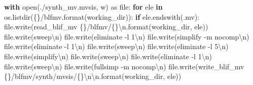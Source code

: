 \documentclass[
]{book}
\newenvironment{Shaded}{\begin{snugshade}}{\end{snugshade}}
\newcommand{\BuiltInTok}[1]{#1}
\newcommand{\CharTok}[1]{\textcolor[rgb]{0.31,0.60,0.02}{#1}}
\newcommand{\ControlFlowTok}[1]{\textcolor[rgb]{0.13,0.29,0.53}{\textbf{#1}}}
\newcommand{\ImportTok}[1]{#1}
\newcommand{\KeywordTok}[1]{\textcolor[rgb]{0.13,0.29,0.53}{\textbf{#1}}}
\newcommand{\NormalTok}[1]{#1}
\newcommand{\SpecialCharTok}[1]{\textcolor[rgb]{0.00,0.00,0.00}{#1}}
\newcommand{\StringTok}[1]{\textcolor[rgb]{0.31,0.60,0.02}{#1}}
\begin{document}
\begin{Shaded}
\begin{Highlighting}[]
  \ControlFlowTok{with} \BuiltInTok{open}\NormalTok{(}\StringTok{\textquotesingle{}./synth\_mv.mvsis\textquotesingle{}}\NormalTok{, }\StringTok{\textquotesingle{}w\textquotesingle{}}\NormalTok{) }\ImportTok{as} \BuiltInTok{file}\NormalTok{:}
    \ControlFlowTok{for}\NormalTok{ ele }\KeywordTok{in}\NormalTok{ os.listdir(}\StringTok{\textquotesingle{}}\SpecialCharTok{\{\}}\StringTok{/blfmv\textquotesingle{}}\NormalTok{.}\BuiltInTok{format}\NormalTok{(working\_dir)):}
      \ControlFlowTok{if}\NormalTok{ ele.endswith(}\StringTok{\textquotesingle{}.mv\textquotesingle{}}\NormalTok{):}
        \BuiltInTok{file}\NormalTok{.write(}\StringTok{\textquotesingle{}read\_blif\_mv }\SpecialCharTok{\{\}}\StringTok{/blfmv/}\SpecialCharTok{\{\}}\CharTok{\textbackslash{}n}\StringTok{\textquotesingle{}}\NormalTok{.}\BuiltInTok{format}\NormalTok{(working\_dir, ele))}
        \BuiltInTok{file}\NormalTok{.write(}\StringTok{\textquotesingle{}sweep}\CharTok{\textbackslash{}n}\StringTok{\textquotesingle{}}\NormalTok{)}
        \BuiltInTok{file}\NormalTok{.write(}\StringTok{\textquotesingle{}eliminate {-}l 1}\CharTok{\textbackslash{}n}\StringTok{\textquotesingle{}}\NormalTok{)}
        \BuiltInTok{file}\NormalTok{.write(}\StringTok{\textquotesingle{}simplify {-}m nocomp}\CharTok{\textbackslash{}n}\StringTok{\textquotesingle{}}\NormalTok{)}
        \BuiltInTok{file}\NormalTok{.write(}\StringTok{\textquotesingle{}eliminate {-}l 1}\CharTok{\textbackslash{}n}\StringTok{\textquotesingle{}}\NormalTok{)}
        \BuiltInTok{file}\NormalTok{.write(}\StringTok{\textquotesingle{}sweep}\CharTok{\textbackslash{}n}\StringTok{\textquotesingle{}}\NormalTok{)}
        \BuiltInTok{file}\NormalTok{.write(}\StringTok{\textquotesingle{}eliminate {-}l 5}\CharTok{\textbackslash{}n}\StringTok{\textquotesingle{}}\NormalTok{)}
        \BuiltInTok{file}\NormalTok{.write(}\StringTok{\textquotesingle{}simplify}\CharTok{\textbackslash{}n}\StringTok{\textquotesingle{}}\NormalTok{)}
        \BuiltInTok{file}\NormalTok{.write(}\StringTok{\textquotesingle{}sweep}\CharTok{\textbackslash{}n}\StringTok{\textquotesingle{}}\NormalTok{)}
        \BuiltInTok{file}\NormalTok{.write(}\StringTok{\textquotesingle{}eliminate {-}l 1}\CharTok{\textbackslash{}n}\StringTok{\textquotesingle{}}\NormalTok{)}
        \BuiltInTok{file}\NormalTok{.write(}\StringTok{\textquotesingle{}sweep}\CharTok{\textbackslash{}n}\StringTok{\textquotesingle{}}\NormalTok{)}
        \BuiltInTok{file}\NormalTok{.write(}\StringTok{\textquotesingle{}fullsimp {-}m nocomp}\CharTok{\textbackslash{}n}\StringTok{\textquotesingle{}}\NormalTok{)}
        \BuiltInTok{file}\NormalTok{.write(}\StringTok{\textquotesingle{}write\_blif\_mv }\SpecialCharTok{\{\}}\StringTok{/blfmv/synth/mvsis/}\SpecialCharTok{\{\}}\CharTok{\textbackslash{}n\textbackslash{}n}\StringTok{\textquotesingle{}}\NormalTok{.}\BuiltInTok{format}\NormalTok{(working\_dir, ele))}
\end{Highlighting}
\end{Shaded}
\end{document}
